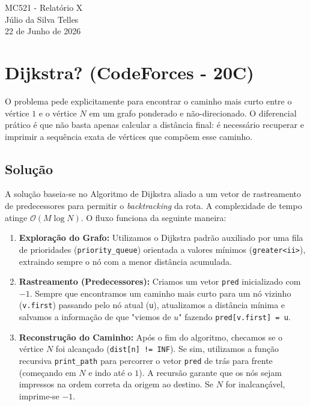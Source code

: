 \documentclass[12pt,a4paper]{article}
\begin{document}
\begin{center}
    {\LARGE MC521 - Relatório X} \\ [2,5em]
    {\large Júlio da Silva Telles} \\ [1,0em]
    {\large 22 de Junho de 2026} \\ [1,5em]
\end{center}

\vspace{1cm} 


\section{Dijkstra? (CodeForces - 20C)}
O problema pede explicitamente para encontrar o caminho mais curto entre o vértice $1$ e o vértice $N$ em um grafo ponderado e não-direcionado. O diferencial prático é que não basta apenas calcular a distância final: é necessário recuperar e imprimir a sequência exata de vértices que compõem esse caminho.

\subsection{Solução}
A solução baseia-se no Algoritmo de Dijkstra aliado a um vetor de rastreamento de predecessores para permitir o \textit{backtracking} da rota. A complexidade de tempo atinge $\mathcal{O}(M \log N)$. O fluxo funciona da seguinte maneira:

\begin{enumerate}
    \item \textbf{Exploração do Grafo:} Utilizamos o Dijkstra padrão auxiliado por uma fila de prioridades (\texttt{priority\_queue}) orientada a valores mínimos (\texttt{greater<ii>}), extraindo sempre o nó com a menor distância acumulada.
    \item \textbf{Rastreamento (Predecessores):} Criamos um vetor \texttt{pred} inicializado com $-1$. Sempre que encontramos um caminho mais curto para um nó vizinho (\texttt{v.first}) passando pelo nó atual (\texttt{u}), atualizamos a distância mínima e salvamos a informação de que "viemos de $u$" fazendo \texttt{pred[v.first] = u}.
    \item \textbf{Reconstrução do Caminho:} Após o fim do algoritmo, checamos se o vértice $N$ foi alcançado (\texttt{dist[n] != INF}). Se sim, utilizamos a função recursiva \texttt{print\_path} para percorrer o vetor \texttt{pred} de trás para frente (começando em $N$ e indo até o $1$). A recursão garante que os nós sejam impressos na ordem correta da origem ao destino. Se $N$ for inalcançável, imprime-se $-1$.
\end{enumerate}
\end{document}
